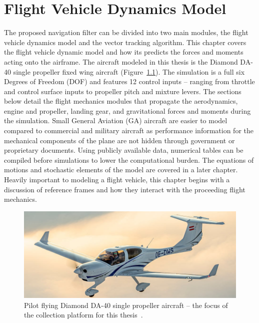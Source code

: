 \chapter{\textbf{Flight Vehicle Dynamics Model}}
The proposed navigation filter can be divided into two main modules, the flight vehicle dynamics model and the vector tracking algorithm. This chapter covers the flight vehicle dynamic model and how its predicts the forces and moments acting onto the airframe.
The aircraft modeled in this thesis is the Diamond DA-40 single propeller fixed wing aircraft (Figure~\ref{fig:DA40}). The simulation is a full six Degrees of Freedom (DOF) and features 12 control inputs {--} ranging from throttle and control surface inputs to propeller pitch and mixture levers. The sections below detail the flight mechanics modules that propagate the aerodynamics, engine and propeller, landing gear, and gravitational forces and moments during the simulation. Small General Aviation (GA) aircraft are easier to model compared to commercial and military aircraft as performance information for the mechanical components of the plane are not hidden through government or proprietary documents. Using publicly available data, numerical tables can be compiled before simulations to lower the computational burden. The equations of motions and stochastic elements of the model are covered in a later chapter. Heavily important to modeling a flight vehicle, this chapter begins with a discussion of reference frames and how they interact with the proceeding flight mechanics.

\begin{figure}[!ht]
    \centering
    \includegraphics[width=.85\linewidth]{Figures/DA40.jpg}
    \caption{Pilot flying Diamond DA-40 single propeller aircraft {--} the focus of the collection platform for this thesis~\cite{DiamondAircraftDA401969}.}\label{fig:DA40}
\end{figure}


